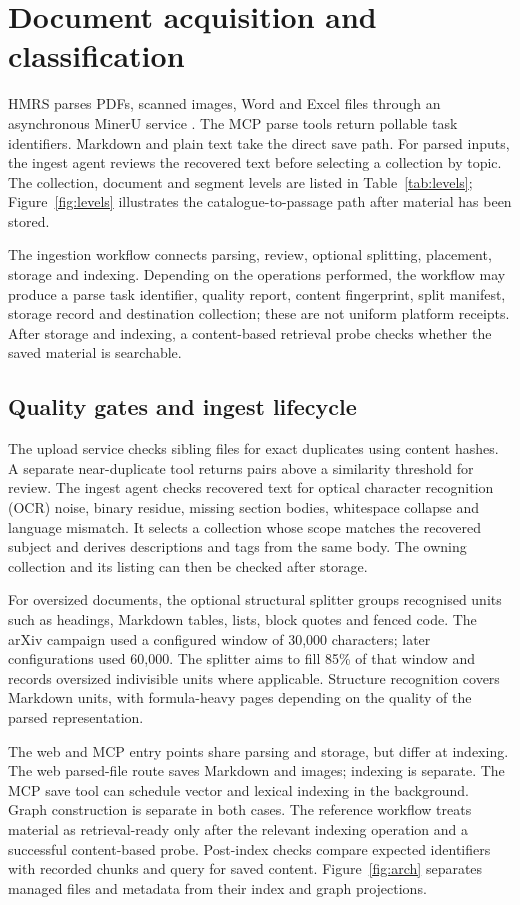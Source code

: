 \section{Document acquisition and classification}
\label{sec:acquisition}

HMRS parses PDFs, scanned images, Word and Excel files through
an asynchronous MinerU service \citep{mineru}. The MCP parse tools return
pollable task identifiers. Markdown and plain text take the direct save
path. For parsed inputs, the ingest agent reviews the recovered text
before selecting a collection by topic. The collection, document and segment
levels are listed in Table~\ref{tab:levels}; Figure~\ref{fig:levels}
illustrates the catalogue-to-passage path after material has been stored.

The ingestion workflow connects parsing, review, optional splitting,
placement, storage and indexing. Depending on the operations performed,
the workflow may produce a parse task identifier, quality report, content
fingerprint, split manifest, storage record and destination collection; these
are not uniform platform receipts. After storage and indexing, a content-based retrieval probe
checks whether the saved material is searchable.

\subsection{Quality gates and ingest lifecycle}

The upload service checks sibling files for exact duplicates using content
hashes. A separate near-duplicate tool returns pairs above a similarity
threshold for review. The ingest agent checks recovered text for
optical character recognition (OCR) noise,
binary residue, missing section bodies, whitespace collapse and language
mismatch. It selects a collection whose scope matches the recovered subject and
derives descriptions and tags from the same body. The owning collection and
its listing can then be checked after storage.

For oversized documents, the optional structural splitter groups recognised
units such as headings, Markdown tables, lists, block quotes and fenced code.
The arXiv campaign used a configured window of 30,000 characters; later configurations used
60,000. The splitter aims to fill 85\% of that window and records
oversized indivisible units where applicable. Structure recognition covers
Markdown units, with formula-heavy pages depending on the quality of the
parsed representation.

The web and MCP entry points share parsing and storage, but differ at
indexing. The web parsed-file route saves Markdown and images; indexing
is separate. The MCP save tool can schedule vector and lexical indexing in
the background. Graph construction is separate in both cases. The reference
workflow treats material as retrieval-ready only after the relevant indexing
operation and a successful content-based probe. Post-index checks compare
expected identifiers with recorded chunks and query for saved content.
Figure~\ref{fig:arch} separates managed files and metadata from their
index and graph projections.
